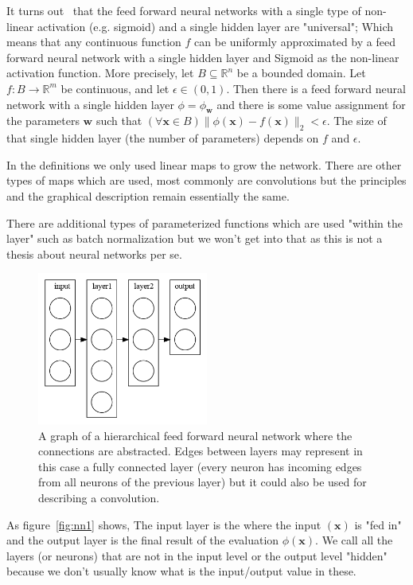 \documentclass[11pt, a4paper]{report}
\theoremstyle{plain}
\theoremstyle{definition}
\theoremstyle{remark}
\newcommand{\R}{\mathbb{R}}
\newcommand{\x}{\mathbf{x}}
\newcommand{\w}{\mathbf{w}}
\newcommand{\lt}{<}
\begin{document}
It turns out~\cite{nielsen2015neural} that the feed forward neural networks
with a single type of non-linear activation (e.g. sigmoid) and a single hidden
layer
are "universal"; Which means that
any continuous function $f$ can be
uniformly approximated by a feed forward neural network
with a single hidden layer and Sigmoid as the non-linear
activation function.
More precisely, let $B \subseteq \R^n$ be a bounded domain. Let $f : B \to \R^m$
be continuous, and let $\epsilon \in (0,1)$. Then there is a feed forward neural
network with a single hidden layer $\phi = \phi_{\w}$ and there is some value assignment
for the parameters $\w$ such that 
$(\forall \x \in B) \|\phi(\x) - f(\x)\|_2 \lt \epsilon $. The size of that single
hidden layer (the number of parameters) depends on $f$ and $\epsilon$.

In the definitions we only used linear maps to grow the network. 
There are other types of maps which are used, most commonly are convolutions 
but the principles and the graphical description remain essentially the same.

There are additional types of parameterized functions which are used "within the
layer" such as batch normalization but we won't get into that as this is not a
thesis about neural networks per se.

\begin{figure}[!h]
\begin{framed}
\centering
\includegraphics[width=0.5\textwidth]{./plots/multilayer.gv.png}
\caption{
A graph of a hierarchical feed forward neural network where the connections 
are abstracted. Edges between layers may represent in this case a fully
connected layer (every neuron has incoming edges from all neurons of the
previous layer) but it could also be used for describing a convolution.
}
\label{fig:nn2}
\end{framed}
\end{figure}

As figure~\ref{fig:nn1} shows, 
The input layer is the where the input $(\x)$ is "fed in" and the output layer
is the final result of the evaluation $\phi(\x)$.
We call all the layers (or neurons) that are 
not in the input level or the output level "hidden"
because we don't usually know what is the input/output value in these.
\end{document}
